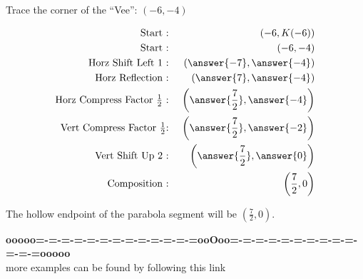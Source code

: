 \documentclass{ximera}
\begin{document}
\begin{procedure} 



Trace the corner of the ``Vee'': $(-6, -4)$





\begin{align*}
\text{Start :} & \text{  } & (-6, K(-6))  \\
\text{Start :} & \text{  } & (-6, -4) \\
\text{Horz Shift Left $1$ :} & \text{  } & \left( \answer{-7}, \answer{-4} \right)   \\
\text{Horz Reflection :} & \text{  } & \left( \answer{7}, \answer{-4} \right)   \\
\text{Horz Compress Factor $\tfrac{1}{2}$ :}  & \text{  } & \left( \answer{\frac{7}{2}}, \answer{-4} \right)   \\
\text{Vert Compress Factor $\tfrac{1}{2}$:} & \text{  } & \left( \answer{\frac{7}{2}}, \answer{-2} \right)   \\
\text{Vert Shift Up $2$ :} & \text{  } & \left( \answer{\frac{7}{2}}, \answer{0} \right)   \\
\text{Composition :} & \text{  } & \left( \frac{7}{2}, 0 \right)   
\end{align*}


The hollow endpoint of the parabola segment will be $\left( \frac{7}{2}, 0 \right)$.

\end{procedure}













\begin{center}
\textbf{\textcolor{green!50!black}{ooooo=-=-=-=-=-=-=-=-=-=-=-=-=ooOoo=-=-=-=-=-=-=-=-=-=-=-=-=ooooo}} \\

more examples can be found by following this link\\ 

\end{center}
\end{document}
